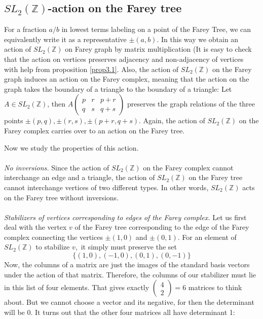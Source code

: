 \subsection{$SL_2(\mathbb{Z})$-action on the Farey tree}
\label{chap4.2}
For a fraction $a/b$ in lowest terms labeling on a point of the Farey Tree, we can equivalently write it as a representative $\pm(a,b)$. In this way we obtain an action of $SL_2(\mathbb{Z})$ on Farey graph by matrix multiplication (It is easy to check that the action on vertices preserves adjacency and non-adjacency  of vertices with help from proposition \ref{prop3.1}. Also, the action of $SL_2(\mathbb{Z})$ on the Farey graph induces an action on the Farey complex, meaning that the action on the graph takes the boundary of a triangle to the boundary of a triangle: Let $A\in SL_2(\mathbb{Z})$, then
$A\left(\begin{array}{lll}
p&r&p+r \\
q&s&q+s
\end{array}\right)$
preserves the graph relations of the three points $\pm(p,q),\pm(r,s),\pm(p+r,q+s)$. Again, the action of $SL_2(\mathbb{Z})$ on the Farey complex carries over to an action on the Farey tree.
\par
Now we study the properties of this action.
\\
\\
\noindent
\textit{No inversions.} Since the action of $SL_2(\mathbb{Z})$ on the Farey complex cannot interchange an edge and a triangle, the action of $SL_2(\mathbb{Z})$ on the Farey tree cannot interchange vertices of two different types. In other words, $SL_2(\mathbb{Z})$ acts on the Farey tree without inversions.
\\
\\
\noindent
\textit{Stabilizers of vertices corresponding to edges of the Farey complex.} Let us first deal with the vertex $v$ of the Farey tree corresponding to the edge of the Farey complex connecting the vertices $\pm(1,0)$ and $\pm(0,1) .$ For an element of $SL_2(\mathbb{Z})$ to stabilize
$v,$ it simply must preserve the set
\[
\{(1,0),(-1,0),(0,1),(0,-1)\}
\]
Now, the columns of a matrix are just the images of the standard basis vectors under the action of that matrix. Therefore, the columns of our stabilizer must lie in this list of four elements. That gives exactly $\left(\begin{array}{l}4 \\ 2\end{array}\right)=6$ matrices to think about. But we cannot choose a vector and its negative, for then the determinant will be 0. It turns out that the other four matrices all have determinant 1:
